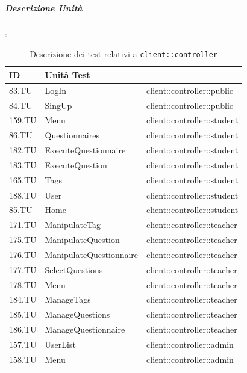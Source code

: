 \documentclass[12pt,a4paper]{article}
\begin{document}
	\subparagraph{Descrizione Unità}:
	\begin{table}[H]
		\begin{center}
			\begin{tabular}{p{} p{0.4\textwidth} p{}}
				\toprule
				\textbf{ID}   & \textbf{Unità Test}	& \textbf{\mgls{package}} \\ \midrule
				\midrule
				83.TU & LogIn & client::controller::public\\ \midrule
				84.TU & SingUp & client::controller::public\\ \midrule
				159.TU & Menu & client::controller::student\\ \midrule
				86.TU & Questionnaires & client::controller::student\\ \midrule
				182.TU & ExecuteQuestionnaire & client::controller::student\\ \midrule
				183.TU & ExecuteQuestion & client::controller::student\\ \midrule
				165.TU & Tags & client::controller::student\\ \midrule
				188.TU & User & client::controller::student\\ \midrule
				85.TU & Home & client::controller::student\\ \midrule
				171.TU & ManipulateTag & client::controller::teacher\\ \midrule
				175.TU & ManipulateQuestion & client::controller::teacher\\ \midrule
				176.TU & ManipulateQuestionnaire & client::controller::teacher\\ \midrule
				177.TU & SelectQuestions & client::controller::teacher\\ \midrule
				178.TU & Menu & client::controller::teacher\\ \midrule
				184.TU & ManageTags & client::controller::teacher\\ \midrule
				185.TU & ManageQuestions & client::controller::teacher\\ \midrule
				186.TU & ManageQuestionnaire & client::controller::teacher\\ \midrule
				157.TU & UserList & client::controller::admin\\ \midrule
				158.TU & Menu & client::controller::admin\\ \midrule			
				\bottomrule
			\end{tabular}
		\end{center}
		\caption{Descrizione dei test relativi a \texttt{client::controller}}
	\end{table}
	
\end{document}

